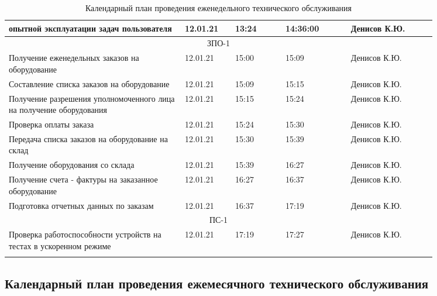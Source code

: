\documentclass[a4paper,14pt]{extarticle}
\begin{document}
\begin{longtable}{|p{0.35\linewidth}|p{0.1\linewidth}|p{0.1\linewidth}|p{0.13\linewidth}|p{0.17\linewidth}|}
		опытной эксплуатации задач 
		пользователя  & 12.01.21 & 13:24 & 14:36:00 & Денисов К.Ю. \\ \hline
		\multicolumn{ 5}{|c|}{ЗПО-1} \\ \hline
		Получение еженедельных заказов на оборудование  & 12.01.21 & 15:00 & 15:09 & Денисов К.Ю. \\ \hline
		Составление списка заказов на оборудование  & 12.01.21 & 15:09 & 15:15 & Денисов К.Ю. \\ \hline
		Получение разрешения уполномоченного лица на получение оборудования  & 12.01.21 & 15:15 & 15:24 & Денисов К.Ю. \\ \hline
		Проверка оплаты заказа  & 12.01.21 & 15:24 & 15:30 & Денисов К.Ю. \\ \hline
		Передача списка заказов на оборудование на склад  & 12.01.21 & 15:30 & 15:39 & Денисов К.Ю. \\ \hline
		Получение оборудования со склада  & 12.01.21 & 15:39 & 16:27 & Денисов К.Ю. \\ \hline
		Получение счета - фактуры на заказанное оборудование  & 12.01.21 & 16:27 & 16:37 & Денисов К.Ю. \\ \hline
		Подготовка отчетных данных по заказам  & 12.01.21 & 16:37 & 17:19 & Денисов К.Ю. \\ \hline
		\multicolumn{ 5}{|c|}{ПС-1} \\ \hline
		Проверка работоспособности устройств на тестах в ускоренном режиме & 12.01.21 & 17:19 & 17:27 & Денисов К.Ю. \\ \hline
		\caption{Календарный план проведения еженедельного технического обслуживания}
		\label{tab:calendar-week}
	\end{longtable}
	
\newpage
\subsection*{Календарный план проведения ежемесячного технического обслуживания}
\end{document}
